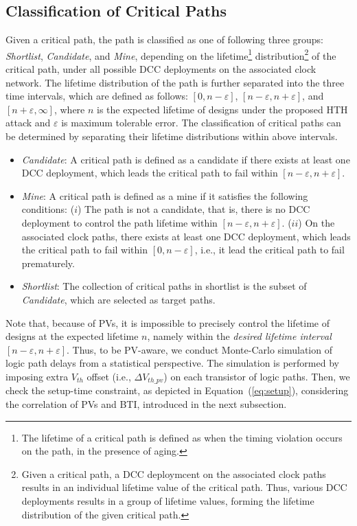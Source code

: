 \subsection{Classification of Critical Paths}
\label{sec:frame:cp}
Given a critical path, the path is classified as one of following three groups: \textit{Shortlist}, \textit{Candidate}, and \textit{Mine}, depending on the lifetime\footnote{The lifetime of a critical path is defined as when the timing violation occurs on the path, in the presence of aging.} distribution\footnote{Given a critical path, a DCC deploymcent on the associated clock paths results in an individual lifetime value of the critical path. Thus, various DCC deployments results in a group of lifetime values, forming the lifetime distribution of the given critical path.} of the critical path, under all possible DCC deployments on the associated clock network. The lifetime distribution of the path is further separated into the three time intervals, which are defined as follows: $[0, n - \varepsilon]$, $[n - \varepsilon, n + \varepsilon]$, and $[n + \varepsilon, \infty]$, where $n$ is the expected lifetime of designs under the proposed HTH attack and $\varepsilon$ is maximum tolerable error. The classification of critical paths can be determined by separating their lifetime distributions within above intervals. 
\begin{itemize}
	\item \textit{Candidate}: A critical path is defined as a candidate if there exists at least one DCC deployment, which leads the critical path to fail within $[n - \varepsilon, n + \varepsilon]$.
	\item \textit{Mine}: A critical path is defined as a mine if it satisfies the following conditions: ($i$) The path is not a candidate, that is, there is no DCC deployment to control the path lifetime within $[n - \varepsilon, n + \varepsilon]$. ($ii$) On the associated clock paths, there exists at least one DCC deployment, which leads the critical path to fail within $[0, n - \varepsilon]$, i.e., it lead the critical path to fail prematurely.
	\item \textit{Shortlist}:  The collection of critical paths in shortlist is the subset of \textit{Candidate}, which are selected as target paths.
\end{itemize}

Note that, because of PVs, it is impossible to precisely control the lifetime of designs at the expected lifetime $n$, namely within the \textit{desired lifetime interval}  $[n - \varepsilon, n + \varepsilon]$. Thus, to be PV-aware, we conduct Monte-Carlo simulation of logic path delays from a statistical perspective. The simulation is performed by imposing extra $V_{th}$ offset (i.e., $\Delta V_{th\_pv}$) on each transistor of logic paths. Then, we check the setup-time constraint, as depicted in Equation~(\ref{eq:setup}), considering the correlation of PVs and BTI, introduced in the next subsection. 

